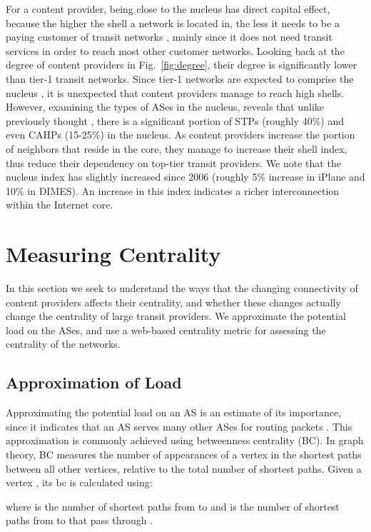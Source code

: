 \documentclass[conference]{IEEEtran}
\newcommand{\figref}[1]{Fig.~\ref{#1}}
\begin{document}
For a content provider, being close to the nucleus has direct capital effect, because the higher
the shell a network is located in, the less it needs to be a paying customer of transit networks \cite{gao01}, mainly
since it does not need transit services in order to reach most other customer networks.
Looking back at the degree of content providers in \figref{fig:degree}, their degree is significantly lower than tier-1 transit networks.
Since tier-1 networks are expected to comprise the nucleus \cite{medusa-pnas}, it is unexpected that content providers
manage to reach high shells. However, examining the types of ASes in the nucleus, reveals that unlike previously thought \cite{medusa-pnas}, there
is a significant portion of STPs (roughly 40\%) and even CAHPs (15-25\%) in the nucleus. As content providers
increase the portion of neighbors that reside in the core, they manage to increase their shell index, thus
reduce their dependency on top-tier transit providers.
We note that the nucleus index has slightly increased since 2006 (roughly 5\% increase in iPlane and
10\% in DIMES). An increase in this index indicates a richer interconnection within the Internet core.

\section{Measuring Centrality}
In this section we seek to understand the ways that the changing connectivity of content providers
affects their centrality, and whether these changes actually change the centrality of large transit providers.
We approximate the potential load on the ASes, and use a web-based
centrality metric for assessing the centrality of the networks.

\subsection{Approximation of Load}
Approximating the potential load on an AS is an estimate of its importance, since it indicates
that an AS serves many other ASes for routing packets \cite{mahadevan}. This approximation is commonly achieved using betweenness centrality (BC).
In graph theory, BC measures the number of appearances of a vertex in the shortest paths between all other vertices,
relative to the total number of shortest paths. Given a vertex , its bc  is calculated using:



\noindent where  is the number of shortest paths from  to  and
 is the number of shortest paths from  to  that pass through .
\end{document}

